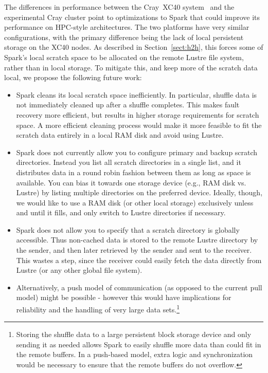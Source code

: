 The differences in performance between the Cray{\textsuperscript{\tiny\textregistered}}~XC40{\textsuperscript{\tiny\texttrademark}} system~\cite{alverson2012cray,craycascadesc12} and the experimental Cray cluster point to optimizations to Spark that could improve its performance on HPC-style architectures.  The two platforms have very similar configurations, with the primary difference being the lack of local persistent storage on the XC40 nodes.  As described in Section~\ref{sect:h2h}, this forces some of Spark's local scratch space to be allocated on the remote Lustre file system, rather than in local storage.  To mitigate this, and keep more of the scratch data local, we propose the following future work:
\begin{itemize}
  \item Spark cleans its local scratch space inefficiently.
  In particular, shuffle data is not immediately cleaned up after a shuffle
  completes. This makes fault recovery more efficient, but results in higher
  storage requirements for scratch space. A more efficient cleaning process would
  make it more feasible to fit the scratch data entirely in a local RAM disk and
  avoid using Lustre.
\item Spark does not currently allow you to configure primary and backup
  scratch directories.  Instead you list all scratch directories in a single
  list, and it distributes data in a round robin fashion between them as long
  as space is available.  You can bias it towards one storage device (e.g., RAM
  disk vs. Lustre) by listing multiple directories on the preferred device.
  Ideally, though, we would like to use a RAM disk (or other local storage)
  exclusively unless and until it fills, and only switch to Lustre directories
  if necessary.
\item Spark does not allow you to specify that a scratch directory is globally
  accessible.  Thus non-cached data is stored to the remote Lustre directory by
  the sender, and then later retrieved by the sender and sent to the receiver.
  This wastes a step, since the receiver could easily fetch the data directly
  from Lustre (or any other global file system).
\item Alternatively, a push model of communication (as opposed to the current
  pull model) might be possible - however this would have implications for
  reliability and the handling of very large data sets.\footnote{Storing the
    shuffle data to a large persistent block storage device and only sending
    it as needed allows Spark to easily shuffle more data than could fit in
    the remote buffers.  In a push-based model, extra logic and synchronization
    would be necessary to ensure that the remote buffers do not overflow.}
\end{itemize}
